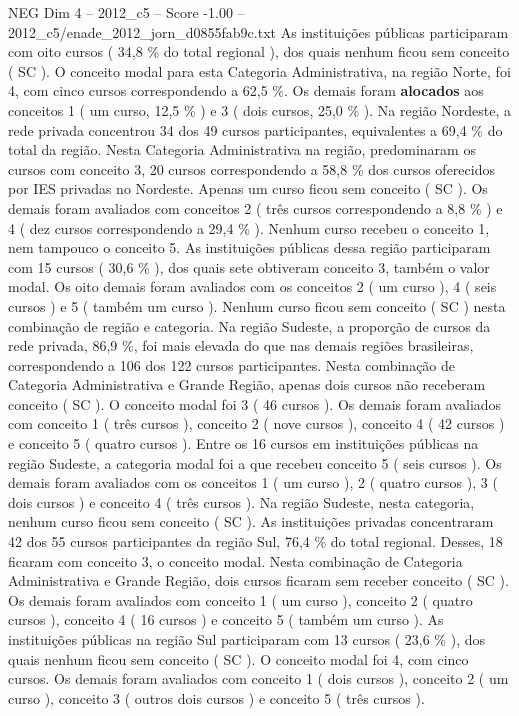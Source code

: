 \begin{textsample}{NEG Dim 4 – 2012\_c5 – Score -1.00 – 2012\_c5/enade\_2012\_jorn\_d0855fab9c.txt}
As instituições públicas participaram com oito cursos ( 34,8 \% do total regional ), dos quais nenhum ficou sem conceito ( SC ).
O conceito modal para esta Categoria Administrativa, na região Norte, foi 4, com cinco cursos correspondendo a 62,5 \%.
Os demais foram \textbf{alocados} aos conceitos 1 ( um curso, 12,5 \% ) e 3 ( dois cursos, 25,0 \% ).
Na região Nordeste, a rede privada concentrou 34 dos 49 cursos participantes, equivalentes a 69,4 \% do total da região.
Nesta Categoria Administrativa na região, predominaram os cursos com conceito 3, 20 cursos correspondendo a 58,8 \% dos cursos oferecidos por IES privadas no Nordeste.
Apenas um curso ficou sem conceito ( SC ).
Os demais foram avaliados com conceitos 2 ( três cursos correspondendo a 8,8 \% ) e 4 ( dez cursos correspondendo a 29,4 \% ).
Nenhum curso recebeu o conceito 1, nem tampouco o conceito 5.
As instituições públicas dessa região participaram com 15 cursos ( 30,6 \% ), dos quais sete obtiveram conceito 3, também o valor modal.
Os oito demais foram avaliados com os conceitos 2 ( um curso ), 4 ( seis cursos ) e 5 ( também um curso ).
Nenhum curso ficou sem conceito ( SC ) nesta combinação de região e categoria.
Na região Sudeste, a proporção de cursos da rede privada, 86,9 \%, foi mais elevada do que nas demais regiões brasileiras, correspondendo a 106 dos 122 cursos participantes.
Nesta combinação de Categoria Administrativa e Grande Região, apenas dois cursos não receberam conceito ( SC ).
O conceito modal foi 3 ( 46 cursos ).
Os demais foram avaliados com conceito 1 ( três cursos ), conceito 2 ( nove cursos ), conceito 4 ( 42 cursos ) e conceito 5 ( quatro cursos ).
Entre os 16 cursos em instituições públicas na região Sudeste, a categoria modal foi a que recebeu conceito 5 ( seis cursos ).
Os demais foram avaliados com os conceitos 1 ( um curso ), 2 ( quatro cursos ), 3 ( dois cursos ) e conceito 4 ( três cursos ).
Na região Sudeste, nesta categoria, nenhum curso ficou sem conceito ( SC ).
As instituições privadas concentraram 42 dos 55 cursos participantes da região Sul, 76,4 \% do total regional.
Desses, 18 ficaram com conceito 3, o conceito modal.
Nesta combinação de Categoria Administrativa e Grande Região, dois cursos ficaram sem receber conceito ( SC ).
Os demais foram avaliados com conceito 1 ( um curso ), conceito 2 ( quatro cursos ), conceito 4 ( 16 cursos ) e conceito 5 ( também um curso ).
As instituições públicas na região Sul participaram com 13 cursos ( 23,6 \% ), dos quais nenhum ficou sem conceito ( SC ).
O conceito modal foi 4, com cinco cursos.
Os demais foram avaliados com conceito 1 ( dois cursos ), conceito 2 ( um curso ), conceito 3 ( outros dois cursos ) e conceito 5 ( três cursos ).

\end{textsample}
